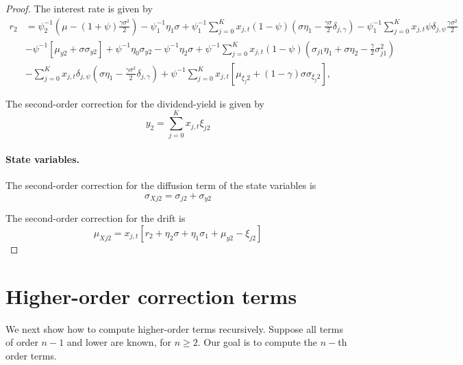 \documentclass[11pt,english]{article}
\begin{document}
\begin{proof}
The interest rate is given by
\begin{align}
    r_2 &= \psi_2^{-1} \left(\mu - (1+\psi) \frac{\gamma\sigma^2}{2}  \right)  
    -\psi_1^{-1} \eta_1 \sigma
    +\psi_1^{-1} \sum_{j=0}^K x_{j,t}   (1-\psi) \left( \sigma \eta_1 - \frac{\gamma \sigma}{2}  \delta_{j,\gamma}\right) -\psi_1^{-1} \sum_{j=0}^K x_{j,t}   \psi \delta_{j,\psi} \frac{\gamma \sigma^2}{2}\nonumber\\
    &-\psi^{-1} \left[ \mu_{y2} + \sigma \sigma_{y2} \right]
    +\psi^{-1} \eta_0 \sigma_{y2}- \psi^{-1} \eta_2 \sigma+ \psi^{-1}\sum_{j=0}^K x_{j,t}   (1-\psi) \left(\sigma_{j1}\eta_1 + \sigma \eta_2 - \frac{\gamma}{2}  \sigma_{j1}^2\right)   \\
    &-\sum_{j=0}^K x_{j,t} \delta_{j,\psi} \left( \sigma \eta_1  - \frac{\gamma \sigma^2}{2} \delta_{j,\gamma}    \right)
    + \psi^{-1}\sum_{j=0}^K x_{j,t} \left[ \mu_{\xi_j2}
    + (1-\gamma) \sigma \sigma_{\xi_j2} \right],
\end{align}

The second-order correction for the dividend-yield is given by
\begin{equation}
    y_2 = \sum_{j=0}^K x_{j,t} \xi_{j2}
\end{equation}

\paragraph{State variables.} The second-order correction for the diffusion term of the state variables is
\begin{equation}
    \sigma_{Xj2} = \sigma_{j2} + \sigma_{y2}
\end{equation}

The second-order correction for the drift is
\begin{equation*}
    \mu_{Xj2} = x_{j,t} \left[ r_2 + \eta_2\sigma + \eta_1 \sigma_1 + \mu_{y2} - \xi_{j2} \right]
\end{equation*}

\end{proof}


\section{Higher-order correction terms}

We next show how to compute higher-order terms recursively. Suppose all terms of order $n-1$ and lower are known, for $n\geq 2$. Our goal is to compute the $n-$th order terms.
\end{document}
